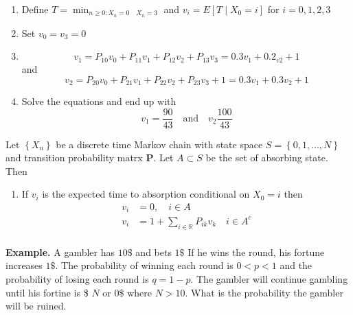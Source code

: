 \documentclass{article}
\theoremstyle{remark}
\begin{document}
\begin{enumerate}
  \item Define $T  = \min_{ n\ge 0 : X_{n} = 0 \quad X_{n} = 3 } $ and $v_{i} = E \left[ T  \mid  X_{0} = i \right] $ for $i  = 0,1,2,3 $
  \item Set $v_{0} = v_{3} = 0$
  \item \[
  v_{1} = P_{10} v_{0} + P_{11} v_{1} + P_{12} v_{2} + P_{13} v_{3}  = 0.3 v_{1} + 0.2_{v2} +1
  \]
  and \[
  v_{2} = P_{20 } v_{0}  + P_{21} v_{1} + P_{22}v_{2} + P_{23 } v_{3} + 1 = 0.3 v_{1} + 0.3 v_{2} + 1
  \]
\item Solve the equations and end up with \[
v_{1} = \frac{90}{43} \quad \text{and} \quad v_{2} \frac{100}{43}
\]

\end{enumerate}


\begin{theorem}
  Let $\left\{ X_{n} \right\}$ be a discrete time Markov chain with state space $S = \left\{ 0, 1, \ldots , N \right\} $ and transition probability matrx $\mathbf{P}$. Let $A \subset S$ be the set of absorbing state. Then
  \begin{enumerate}
    \item If $v_{i}$ is the expected time to absorption conditional on $X_{0} = i$ then \[
    \begin{split}
      v_{i}  & = 0, \quad  i \in  A   \\
      v_{i} &=  1+ \sum_{ i \in  \mathbb{R} }^{} P_{ik} v_{k} \quad i \in  A^{c}  \\
    \end{split}
    \]
  \end{enumerate}
\end{theorem}


\textbf{Example.}
A gambler has $10 \$$ and bets  $1\$$  If he wins the round, his fortune increases $ 1 \$$.  The probability of winning each round is  $ 0  < p < 1$ and the probability of losing each round is $q = 1 - p$. The gambler will continue gambling until his fortine is \$ $N$ or $0 \$$ where  $N > 10$. What is the probability the gambler will be ruined.
\end{document}
